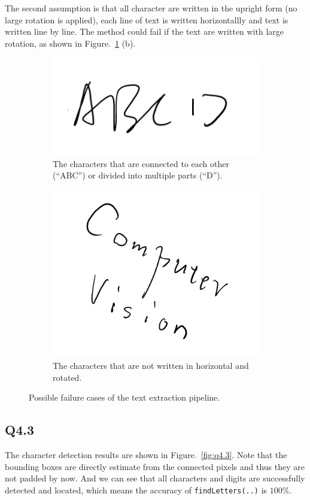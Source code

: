 \documentclass[11pt]{article}
\newcommand{\code}[1]{\texttt{#1}}
\begin{document}
The second assumption is that all character are written in the upright form (no large rotation is applied), each line of text is written horizontallly and text is written line by line. The method could fail if the text are written with large rotation, as shown in Figure.~\ref{fig:q4.1} (b).

\begin{figure}[h!]
    \begin{subfigure}{.495\textwidth}
      \centering
      \includegraphics[width=.5\linewidth]{../results/q4_1a.png}
      \caption{The characters that are connected to each other (``ABC'') or divided into multiple parts (``D''). }
    \end{subfigure}
    \begin{subfigure}{.495\textwidth}
      \centering
      \includegraphics[width=.5\linewidth]{../results/q4_1b.png}
      \caption{The characters that are not written in horizontal and rotated. }
    \end{subfigure}\hfill
    \caption{Possible failure cases of the text extraction pipeline. }
    \label{fig:q4.1}
\end{figure}

\newpage

\subsection*{Q4.3}

The character detection results are shown in Figure.~\ref{fig:q4.3}. Note that the bounding boxes are directly estimate from the connected pixels and thus they are not padded by now. And we can see that all characters and digits are successfully detected and located, which means the accuracy of \code{findLetters(..)} is $100\%$.
\end{document}
